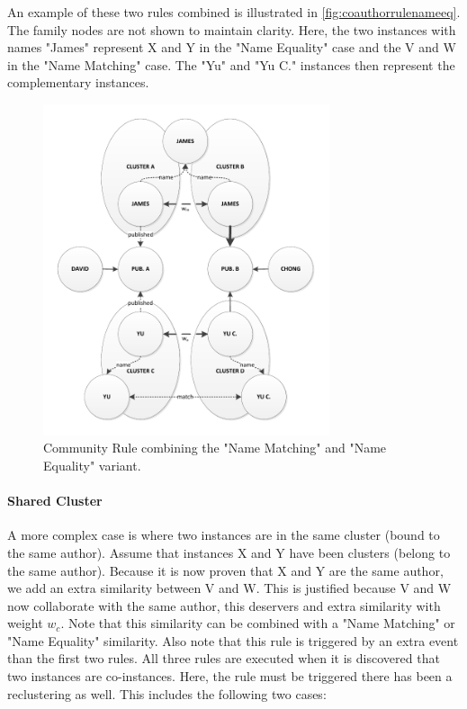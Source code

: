 An example of these two rules combined is illustrated in \autoref{fig:coauthorrulenameeq}. The family nodes are not shown to maintain clarity. Here, the two instances with names "James" represent X and Y in the "Name Equality" case and the V and W in the "Name Matching" case. The "Yu" and "Yu C." instances then represent the complementary instances.

\begin{figure}[htb]
	\centering
		\includegraphics[width=0.75\textwidth]{fig/coauthorrulenameeq}
	\caption{Community Rule combining the "Name Matching" and "Name Equality" variant.}
	\label{fig:coauthorrulenameeq}
\end{figure}

\paragraph{Shared Cluster} A more complex case is where two instances are in the same cluster (bound to the same author). Assume that instances X and Y have been clusters (belong to the same author). Because it is now proven that X and Y are the same author, we add an extra similarity between V and W. This is justified because V and W now collaborate with the same author, this deservers and extra similarity with weight $w_c$. Note that this similarity can be combined with a "Name Matching" or "Name Equality" similarity. Also note that this rule is triggered by an extra event than the first two rules. All three rules are executed when it is discovered that two instances are co-instances. Here, the rule must be triggered there has been a reclustering as well. This includes the following two cases:

